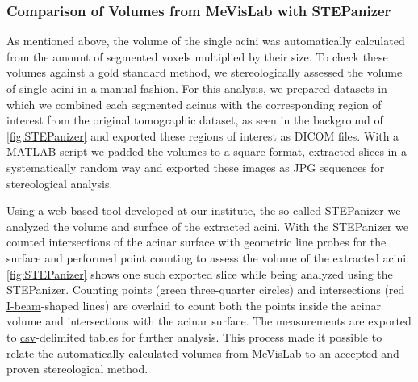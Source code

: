 \documentclass[%
	paper=a4,%
	abstract=true,%
	]{scrartcl}
\begin{document}
\subsubsection{Comparison of Volumes from MeVisLab with STEPanizer}
As mentioned above, the volume of the single acini was automatically calculated from the amount of segmented voxels multiplied by their size. To check these volumes against a gold standard method, we stereologically assessed the volume of single acini in a manual fashion. For this analysis, we prepared datasets in which we combined each segmented acinus with the corresponding region of interest from the original tomographic dataset, as seen in the background of \autoref{fig:STEPanizer} and exported these regions of interest as DICOM files. With a MATLAB script we padded the volumes to a square format, extracted slices in a systematically random way and exported these images as JPG sequences for stereological analysis.

Using a web based tool developed at our institute, the so-called STEPanizer \cite[available free of charge at \url{http://stepanizer.com}]{Tschanz2011} we analyzed the volume and surface of the extracted acini. With the STEPanizer we counted intersections of the acinar surface with geometric line probes for the surface and performed point counting to assess the volume of the extracted acini. \autoref{fig:STEPanizer} shows one such exported slice while being analyzed using the STEPanizer. Counting points (green three-quarter circles) and intersections (red \href{https://encrypted.google.com/search?q=i-beam&tbm=isch}{I-beam}-shaped lines) are overlaid to count both the points inside the acinar volume and intersections with the acinar surface. The measurements are exported to \href{https://secure.wikimedia.org/wikipedia/en/w/index.php?title=Comma-separated_values&oldid=441921632}{csv}-delimited tables for further analysis. This process made it possible to relate the automatically calculated volumes from MeVisLab to an accepted and proven stereological method.
\end{document}
